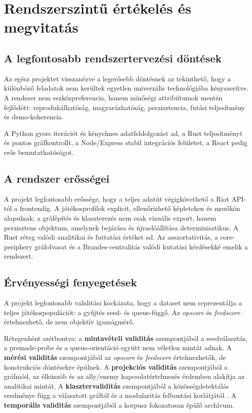 \chapter{Rendszerszintű értékelés és megvitatás}

\section{A legfontosabb rendszertervezési döntések}

Az egész projektet visszanézve a legerősebb döntésnek az tekinthető, hogy a különböző feladatok nem kerültek egyetlen univerzális technológiába kényszerítve. A rendszer nem eszközpreferencia, hanem minőségi attribútumok mentén fejlődött: reprodukálhatóság, magyarázhatóság, perzisztencia, futási teljesítmény és demo-koherencia.

A Python gyors iterációt és kényelmes adatfeldolgozást ad, a Rust teljesítményt és pontos gráfkontrollt, a Node/Express stabil integrációs felületet, a React pedig erős bemutathatóságot.

\section{A rendszer erősségei}

A projekt legfontosabb erőssége, hogy a teljes adatút végigkövethető a Riot API-tól a frontendig. A játékosprofilok explicit, ellenőrizhető képleteken és mezőkön alapulnak; a gráfépítés és klaszterezés nem csak vizuális export, hanem perzisztens objektum, amelynek bejárása és újraelőállítása determinisztikus. A Rust réteg valódi analitikai és futtatási értéket ad. Az asszortativitás, a core-periphery gráfolvasat és a Brandes-centralitás valódi kutatási kérdésekké emelik a rendszert.

\section{Érvényességi fenyegetések}

A projekt legfontosabb validitási kockázata, hogy a dataset nem reprezentálja a teljes játékospopulációt: a gyűjtés seed- és queue-függő. Az \textit{opscore} és \textit{feedscore} értelmezhető, de nem objektív igazságmérő.

Rétegenként szétbontva: a \textbf{mintavételi validitás} szempontjából a seedválasztás, a premade-probe és a queue-orientáció együtt nem véletlen mintát adnak. A \textbf{mérési validitás} szempontjából az \textit{opscore} és \textit{feedscore} értelmezhetők, de konstrukciós döntésekre épülnek. A \textbf{projekciós validitás} szempontjából a gráfmód, az élküszöb és az ally/enemy kapcsolatértelmezés érdemben alakítja az analitikai mintát. A \textbf{klasztervaliditás} szempontjából a közösségdetektálás eredménye függ a választott gráftól és a modularitás felbontási korlátjától \cite{fortunato_barthelemy2007}. A \textbf{temporális validitás} szempontjából a korpusz fokozatosan épülő archívum.

